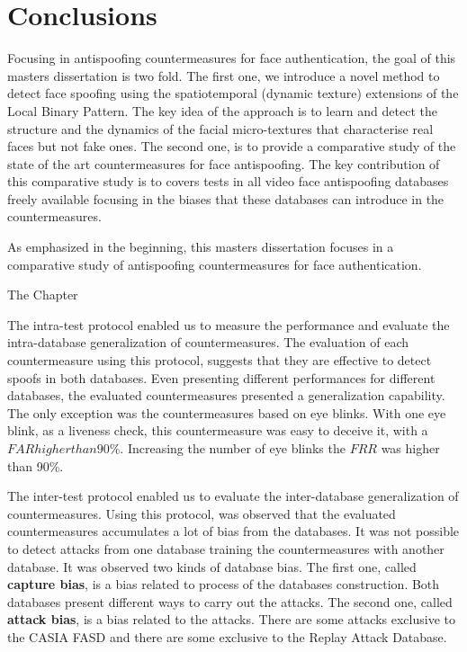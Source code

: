 \chapter{Conclusions}
\label{chap:Conclusions}

Focusing in antispoofing countermeasures for face authentication, the goal of this masters dissertation is two fold. The first one, we introduce a novel method to detect face spoofing using the spatiotemporal (dynamic texture) extensions of the Local Binary Pattern. The key idea of the approach is to learn and detect the structure and the dynamics of the facial micro-textures that characterise real faces but not fake ones. The second one, is to provide a comparative study of the state of the art countermeasures for face antispoofing. The key contribution of this comparative study is to covers tests in all video face antispoofing databases freely available focusing in the biases that these databases can introduce in the countermeasures.


As emphasized in the beginning, this masters dissertation focuses in a comparative study of antispoofing countermeasures for face authentication. 

The Chapter 

The intra-test protocol enabled us to measure the performance and evaluate the intra-database generalization of countermeasures. The evaluation of each countermeasure using this protocol, suggests that they are effective to detect spoofs in both databases. Even presenting different performances for different databases, the evaluated countermeasures presented a generalization capability. The only exception was the countermeasures based on eye blinks. With one eye blink, as a liveness check, this countermeasure was easy to deceive it, with a $FAR higher than 90\%$. Increasing the number of eye blinks the $FRR$ was higher than 90\%.

The inter-test protocol enabled us to evaluate the inter-database generalization of countermeasures. Using this protocol, was observed that the evaluated countermeasures accumulates a lot of bias from the databases. It was not possible to detect attacks from one database training the countermeasures with another database. It was observed two kinds of database bias. The first one, called \textbf{capture bias}, is a bias related to process of the databases construction. Both databases present different ways to carry out the attacks. The second one, called \textbf{attack bias}, is a bias related to the attacks. There are some attacks exclusive to the CASIA FASD and there are some exclusive to the Replay Attack Database.

